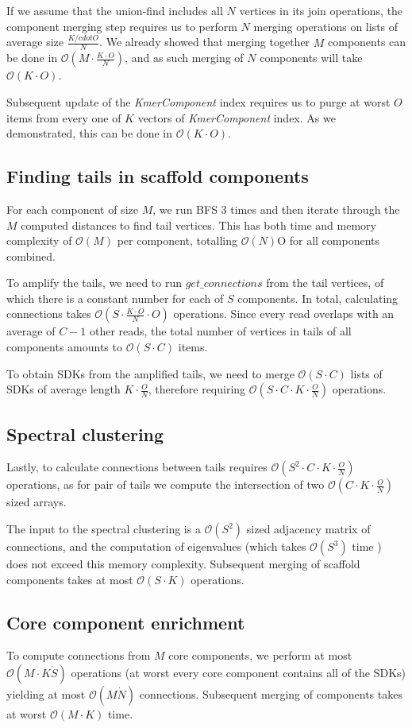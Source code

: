 If we assume that the union-find includes all $N$ vertices in its join operations, the component merging step requires us to perform $N$ merging operations on lists of average size $\frac{K /cdot O}{N}$. We already showed that merging together $M$ components can be done in $\mathcal{O}(M \cdot \frac{K \cdot O}{N})$, and as such merging of $N$ components will take $\mathcal{O}(K \cdot O)$.

Subsequent update of the \textit{KmerComponent} index requires us to purge at worst $O$ items from every one of $K$ vectors of \textit{KmerComponent} index. As we demonstrated, this can be done in $\mathcal{O}(K \cdot O)$.

\subsection{Finding tails in scaffold components}

For each component of size $M$, we run BFS 3 times and then iterate through the $M$ computed distances to find tail vertices. This has both time and memory complexity of $\mathcal{O}(M)$ per component, totalling $\mathcal{O}(N)$O for all components combined.

To amplify the tails, we need to run $get\_connections$ from the tail vertices, of which there is a constant number for each of $S$ components. In total, calculating connections takes $\mathcal{O}(S \cdot \frac{K \cdot O}{N} \cdot O)$ operations. Since every read overlaps with an average of $C - 1$ other reads, the total number of vertices in tails of all components amounts to $\mathcal{O}(S \cdot C)$ items.

To obtain SDKs from the amplified tails, we need to merge $\mathcal{O}(S \cdot C)$ lists of SDKs of average length $K \cdot \frac{O}{N}$, therefore requiring $\mathcal{O}(S \cdot C \cdot K \cdot \frac{O}{N})$ operations. 

\subsection{Spectral clustering}

Lastly, to calculate connections between tails requires $\mathcal{O}(S^2 \cdot C \cdot K \cdot \frac{O}{N})$ operations, as for pair of tails we compute the intersection of two $\mathcal{O}(C \cdot K \cdot \frac{O}{N})$ sized arrays.

The input to the spectral clustering is a $\mathcal{O}(S^2)$ sized adjacency matrix of connections, and the computation of eigenvalues (which takes $\mathcal{O}(S^3)$ time ) does not exceed this memory complexity. Subsequent merging of scaffold components takes at most $\mathcal{O}(S \cdot K)$ operations.

\subsection{Core component enrichment}

To compute connections from $M$ core components, we perform at most $\mathcal{O}(M \cdot K \dot S)$ operations (at worst every core component contains all of the SDKs) yielding at most $\mathcal{O}(M \dot N)$ connections. Subsequent merging of components takes at worst $\mathcal{O}(M \cdot K)$ time.